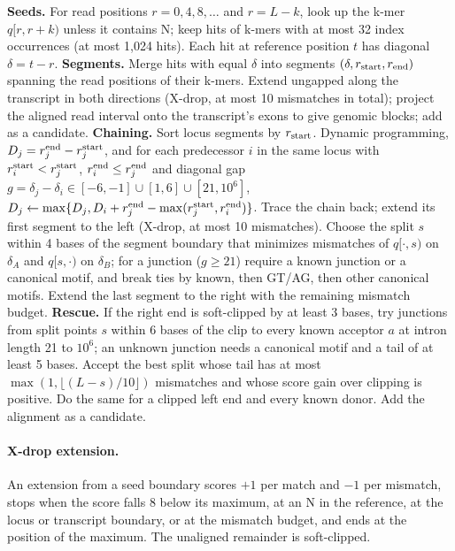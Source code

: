 \documentclass[11pt]{article}
\begin{document}
\begin{algorithm}[ht]
\caption{Alignment candidates of one read orientation $q$ of length $L$.}
\label{alg:align}
\begin{algorithmic}[1]
\State \textbf{Seeds.} For read positions $r=0,4,8,\ldots$ and $r=L-k$, look up the k-mer $q[r,r+k)$ unless it contains N; keep hits of k-mers with at most 32 index occurrences (at most 1{,}024 hits). Each hit at reference position $t$ has diagonal $\delta=t-r$.
\State \textbf{Segments.} Merge hits with equal $\delta$ into segments $(\delta,r_{\rm start},r_{\rm end})$ spanning the read positions of their k-mers.
  \State Extend ungapped along the transcript in both directions (X-drop, at most 10 mismatches in total); project the aligned read interval onto the transcript's exons to give genomic blocks; add as a candidate.
\EndFor
\State \textbf{Chaining.} Sort locus segments by $r_{\rm start}$. Dynamic programming, $D_j=r^{\rm end}_j-r^{\rm start}_j$, and for each predecessor $i$ in the same locus with $r^{\rm start}_i<r^{\rm start}_j$, $r^{\rm end}_i\le r^{\rm end}_j$ and diagonal gap $g=\delta_j-\delta_i\in[-6,-1]\cup[1,6]\cup[21,10^6]$, $D_j\gets\max\{D_j,D_i+r^{\rm end}_j-\max(r^{\rm start}_j,r^{\rm end}_i)\}$.
  \State Trace the chain back; extend its first segment to the left (X-drop, at most 10 mismatches).
    \State Choose the split $s$ within 4 bases of the segment boundary that minimizes mismatches of $q[\cdot,s)$ on $\delta_A$ and $q[s,\cdot)$ on $\delta_B$; for a junction ($g\ge21$) require a known junction or a canonical motif, and break ties by known, then GT/AG, then other canonical motifs.
  \EndFor
  \State Extend the last segment to the right with the remaining mismatch budget.
  \State \textbf{Rescue.} If the right end is soft-clipped by at least 3 bases, try junctions from split points $s$ within 6 bases of the clip to every known acceptor $a$ at intron length 21 to $10^6$; an unknown junction needs a canonical motif and a tail of at least 5 bases. Accept the best split whose tail has at most $\max(1,\lfloor (L-s)/10\rfloor)$ mismatches and whose score gain over clipping is positive. Do the same for a clipped left end and every known donor.
  \State Add the alignment as a candidate.
\EndFor
\end{algorithmic}
\end{algorithm}

\paragraph{X-drop extension.} An extension from a seed boundary scores $+1$ per match and $-1$ per mismatch, stops when the score falls 8 below its maximum, at an N in the reference, at the locus or transcript boundary, or at the mismatch budget, and ends at the position of the maximum. The unaligned remainder is soft-clipped.
\end{document}
